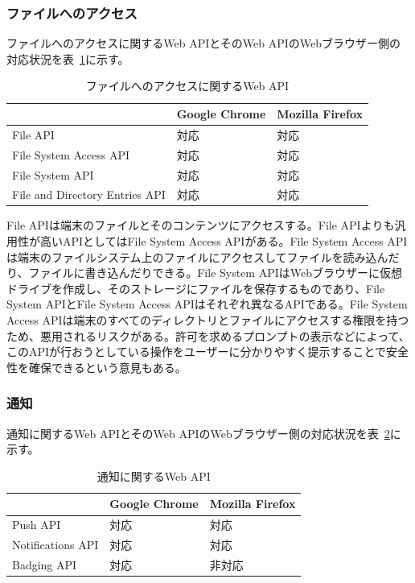 \subsubsection{ファイルへのアクセス}\label{subsubsection:ファイルへのアクセス}
ファイルへのアクセスに関するWeb APIとそのWeb APIのWebブラウザー側の対応状況を表~\ref{table:ファイルへのアクセスに関するWeb API}に示す。
\begin{table}
  \caption{ファイルへのアクセスに関するWeb API}\label{table:ファイルへのアクセスに関するWeb API}
  \centering
  \begin{tabular}{|p{20em}|p{10em}|p{10em}|}
    \hline
    & Google Chrome & Mozilla Firefox \\ \hline
    File API & 対応 & 対応 \\ \hline
    File System Access API & 対応 & 対応 \\ \hline
    File System API & 対応 & 対応 \\ \hline
    File and Directory Entries API & 対応 & 対応 \\ \hline
  \end{tabular}
\end{table}

File APIは端末のファイルとそのコンテンツにアクセスする。File APIよりも汎用性が高いAPIとしてはFile System Access APIがある。File System Access APIは端末のファイルシステム上のファイルにアクセスしてファイルを読み込んだり、ファイルに書き込んだりできる。File System APIはWebブラウザーに仮想ドライブを作成し、そのストレージにファイルを保存するものであり、File System APIとFile System Access APIはそれぞれ異なるAPIである。File System Access APIは端末のすべてのディレクトリとファイルにアクセスする権限を持つため、悪用されるリスクがある。許可を求めるプロンプトの表示などによって、このAPIが行おうとしている操作をユーザーに分かりやすく提示することで安全性を確保できるという意見もある。

\subsubsection{通知}\label{subsubsection:通知}
通知に関するWeb APIとそのWeb APIのWebブラウザー側の対応状況を表~\ref{table:通知に関するWeb API}に示す。
\begin{table}
  \caption{通知に関するWeb API}\label{table:通知に関するWeb API}
  \centering
  \begin{tabular}{|p{20em}|p{10em}|p{10em}|}
    \hline
    & Google Chrome & Mozilla Firefox \\ \hline
    Push API & 対応 & 対応 \\ \hline
    Notifications API & 対応 & 対応 \\ \hline
    Badging API & 対応 & 非対応 \\ \hline
  \end{tabular}
\end{table}

